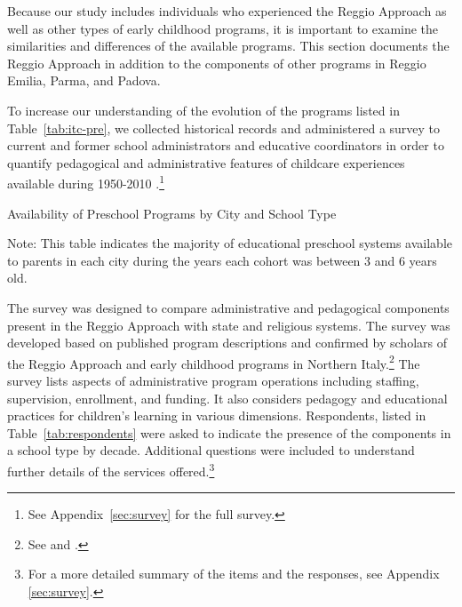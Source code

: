 
Because our study includes individuals who experienced the Reggio Approach as well as other types of early childhood programs, it is important to examine the similarities and differences of the available programs. This section documents the Reggio Approach in addition to the components of other programs in Reggio Emilia, Parma, and Padova.

To increase our understanding of the evolution of the programs listed in Table~\ref{tab:itc-pre}, we collected historical records \citep{Padova-Admin-Data_1964-2011,Reggio-Admin-data_1966-2006,Reggio-Annual-Journals_1994-2011} and administered a survey to current and former school administrators and educative coordinators in order to quantify pedagogical and administrative features of childcare experiences available during 1950-2010 \citep{CEHD_2016_Historical-Analysis}.\footnote{See Appendix~\ref{sec:survey} for the full survey.} 

\begin{table}[H]
\centering
\caption{Availability of Preschool Programs by City and School Type}\label{tab:itc-pre}
\begin{adjustbox}{width=\textwidth}
\begin{threeparttable}
	
\begin{tablenotes}
Note: This table indicates the majority of educational preschool systems available to parents in each city during the years each cohort was between 3 and 6 years old. 
\end{tablenotes}
\end{threeparttable}
\end{adjustbox}
\end{table}

The survey was designed to compare administrative and pedagogical components present in the Reggio Approach with state and religious systems. The survey was developed based on published program descriptions and confirmed by scholars of the Reggio Approach and early childhood programs in Northern Italy.\footnote{See \citet{Edwards-etal-eds_1998_Hundred-Languages} and \citet{Corsaro_2008_Policy-Practice}.} The survey lists aspects of administrative program operations including staffing, supervision, enrollment, and funding. It also considers pedagogy and educational practices for children's learning in various dimensions. Respondents, listed in Table~\ref{tab:respondents} were asked to indicate the presence of the components in a school type by decade. Additional questions were included to understand further details of the services offered.\footnote{For a more detailed summary of the items and the responses, see Appendix \ref{sec:survey}.}

